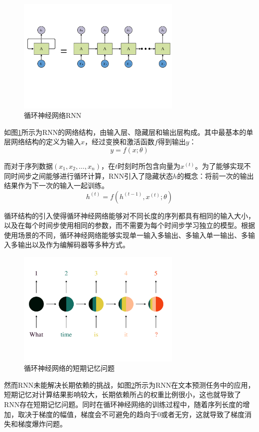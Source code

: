 \documentclass[master]{thesis-uestc}
\begin{document}
\begin{figure}[!ht]
\centering 
\includegraphics[width=0.7\textwidth]{./pic/RNN-2.pdf}
\caption{循环神经网络RNN}
\label{Figure.2.1}
\end{figure}
如图\ref{Figure.2.1}所示为RNN的网络结构，由输入层、隐藏层和输出层构成。其中最基本的单层网络结构的定义为输入$x$，经过变换和激活函数$f$得到输出$y$：
\begin{equation}
   y = f(x;\theta)
\end{equation}

而对于序列数据$(x_1,x_2,\dots,x_n)$，在$t$时刻时所包含向量为$x^{(t)}$。为了能够实现不同时间步之间能够进行循环计算，RNN引入了隐藏状态$h$的概念：将前一次的输出结果作为下一次的输入一起训练。
\begin{equation}
   h^{(t)} = f(h^{(t-1)},x^{(t)};\theta)
\end{equation}

循环结构的引入使得循环神经网络能够对不同长度的序列都具有相同的输入大小，以及在每个时间步使用相同的参数，而不需要为每个时间步学习独立的模型。根据使用场景的不同，循环神经网络能够实现单一输入多输出、多输入单一输出、多输入多输出以及作为编解码器等多种方式。

\begin{figure}[!ht]
\centering 
\includegraphics[width=0.7\textwidth]{./pic/rnn4.pdf}
\caption{循环神经网络的短期记忆问题}
\label{Figure.2.2}
\end{figure}
然而RNN未能解决长期依赖的挑战，如图\ref{Figure.2.2}所示为RNN在文本预测任务中的应用，短期记忆对计算结果影响较大，长期依赖所占的权重比例很小，这也就导致了RNN存在短期记忆问题。同时在循环神经网络的训练过程中，随着序列长度的增加，取决于梯度的幅值，梯度会不可避免的趋向于0或者无穷，这就导致了梯度消失和梯度爆炸问题。
\end{document}
